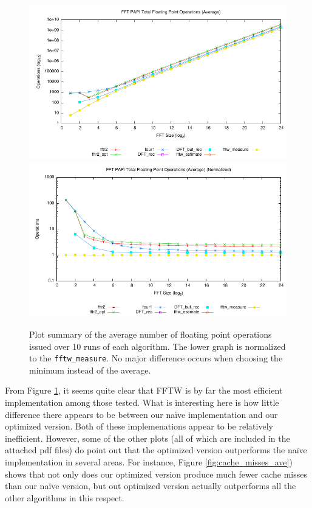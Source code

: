 \documentclass[11 pt]{article}
\begin{document}
\begin{figure}[htbp]
  \centering
	\includegraphics[width=\columnwidth]{../plots/fp_ops_ave}
	\includegraphics[width=\columnwidth]{../plots/fp_ops_ave_norm}
  \caption{Plot summary of the average number of floating point operations
		issued over 10 runs of each algorithm. The lower graph is normalized to the
		\texttt{fftw\_measure}. No major difference occurs when choosing the
		minimum instead of the average.}
  \label{fig:fp_ops}
\end{figure}

From Figure \ref{fig:fp_ops}, it seems quite clear that FFTW is by far the most
efficient implementation among those tested.  What is interesting here is how
little difference there appears to be between our na\"{i}ve implementation and
our optimized version.  Both of these implemenations appear to be relatively
inefficient.  However, some of the other plots (all of which are included in
the attached pdf files) do point out that the optimized version outperforms the
na\"{i}ve implementation in several areas.  For instance, Figure
\ref{fig:cache_misses_ave}) shows that not only does our optimized version produce
much fewer cache misses than our na\"{i}ve version, but out optimized version
actually outperforms all the other algorithms in this respect.
\end{document}
